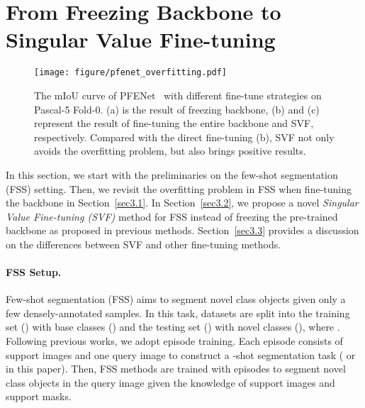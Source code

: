 \documentclass{article}
\begin{document}
 \section{From Freezing Backbone to Singular Value Fine-tuning}
\vspace{-.4em}
\begin{figure}
	\centering
	\texttt{[image: figure/pfenet\_overfitting.pdf]}
	\vspace{-0.6cm}
	\caption{The mIoU curve of PFENet~\cite{tian2020prior} with different fine-tune strategies on Pascal-5 Fold-0. (a) is the result of freezing backbone, (b) and (c) represent the result of fine-tuning the entire backbone and SVF, respectively. Compared with the direct fine-tuning (b), SVF not only avoids the overfitting problem, but also brings positive results.}
	\label{fig:overfitting}
	
	\vspace{-1.4em}
\end{figure}
In this section, we start with the preliminaries on the few-shot segmentation (FSS) setting. Then, we revisit the overfitting problem in FSS when fine-tuning the backbone in Section~\ref{sec3.1}. In Section~\ref{sec3.2}, we propose a novel {\em Singular Value Fine-tuning (SVF)} method for FSS instead of freezing the pre-trained backbone as proposed in previous methods. Section~\ref{sec3.3} provides a discussion on the differences between SVF and other fine-tuning methods.

\vspace{-1.0em}
\paragraph{FSS Setup.} Few-shot segmentation (FSS) aims to segment novel class objects given only a few densely-annotated samples. In this task, datasets are split into the training set () with base classes () and the testing set () with novel classes (), where . Following previous works, we adopt episode training. Each episode consists of  support images and one query image to construct a -shot segmentation task ( or  in this paper). Then, FSS methods are trained with episodes to segment novel class objects in the query image given the knowledge of  support images and support masks.
\vspace{-.7em}
\end{document}
